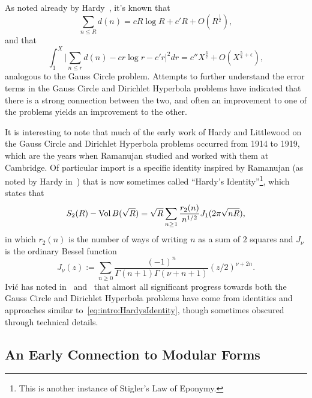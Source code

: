 As noted already by Hardy~\cite{Hardy1917}, it's known that
\begin{equation}
  \sum_{n \leq R} d(n) = cR \log R + c' R + O(R^{\frac{1}{2}}),
\end{equation}
and that
\begin{equation}
  \int_1^X \Big\lvert \sum_{n \leq r} d(n) - c r \log r - c' r \Big\rvert^2 dr = c'' X^{\frac{3}{2}} +
  O(X^{\frac{5}{4} + \epsilon}),
\end{equation}
analogous to the Gauss Circle problem.
Attempts to further understand the error terms in the Gauss Circle and Dirichlet Hyperbola
problems have indicated that there is a strong connection between the two, and often an
improvement to one of the problems yields an improvement to the other.


It is interesting to note that much of the early work of Hardy and Littlewood on
the Gauss Circle and Dirichlet Hyperbola problems occurred from 1914 to 1919, which are
the years when Ramanujan studied and worked with them at Cambridge.
Of particular import is a specific identity inspired by Ramanujan (as noted by Hardy
in~\cite{Hardy1959onRamanujan}) that is now sometimes called ``Hardy's
Identity''\footnote{This is another instance of Stigler's Law of Eponymy.},
which states that
\begin{equation}\label{eq:intro:HardysIdentity}
  S_2(R) - \operatorname*{Vol} B(\sqrt R) =  \sqrt{R} \sum_{n \geq 1} \frac{r_2(n)}{n^{1/2}} J_1(2\pi
  \sqrt{n R}),
\end{equation}
in which $r_2(n)$ is the number of ways of writing $n$ as a sum of $2$ squares and $J_\nu$ is
the ordinary Bessel function
\begin{equation}
  J_\nu(z) := \sum_{n \geq 0} \frac{(-1)^n}{\Gamma(n+1) \Gamma(\nu + n + 1)}
  (z/2)^{\nu + 2n}.
\end{equation}
Ivi\'c has noted in~\cite{ivic2004lattice} and~\cite{ivic1996} that  almost all
significant progress towards both the Gauss Circle and Dirichlet Hyperbola problems have
come from identities and approaches similar to~\eqref{eq:intro:HardysIdentity}, though
sometimes obscured through technical details.





\subsection{An Early Connection to Modular Forms}


